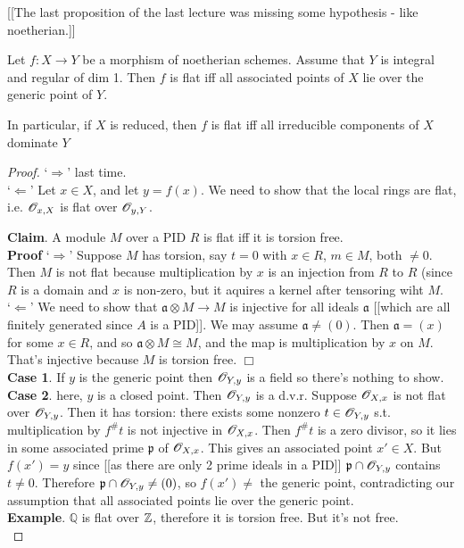  \setcounter{lecture}{25}

[[The last proposition of the last lecture was missing some
hypothesis -  like noetherian.]]

\begin{proposition} Let $f:X\rightarrow Y$ be a morphism of
noetherian schemes. Assume that $Y$ is integral and regular of dim
1. Then $f$ is flat iff all associated points of $X$ lie over the
generic point of $Y$.

In particular, if $X$ is reduced, then $f$ is flat iff all
irreducible components of $X$ dominate $Y$ \end{proposition}
\begin{proof}
`$\Rightarrow$' last time.\\

`$\Leftarrow$' Let $x \in X$, and let $y = f(x)$. We need to show
that the local rings are flat, i.e. $\mathscr{O}_{x,X}$ is flat over
$\mathscr{O}_{y,Y}$.

\textbf{Claim}. A module $M$ over a PID $R$ is flat iff it is
torsion free. \\

\textbf{Proof} `$\Rightarrow$' Suppose $M$ has torsion, say $t =
0$ with $x \in R$, $m \in M$, both $\neq 0$. Then $M$ is not flat
because multiplication by $x$ is an injection from $R$ to $R$
(since $R$ is a domain and $x$ is non-zero, but it aquires a
kernel after
tensoring wiht $M$.\\

`$\Leftarrow$' We need to show that $\mathfrak{a} \otimes M
\rightarrow M$ is injective for all ideals $\mathfrak{a}$ [[which
are all finitely generated since $A$ is a PID]]. We may assume
$\mathfrak{a} \neq (0)$. Then $\mathfrak{a} = (x)$ for some $x \in
R$, and so $\mathfrak{a}\otimes M \cong M$, and the map is
multiplication by $x$ on $M$. That's injective because $M$ is
torsion free. $\Box$\\


\textbf{Case 1}. If $y$ is the generic point then $\mathscr{O}_{Y,y}$ is a
field so there's nothing to show.\\

\textbf{Case 2}. here, $y$ is a closed point. Then $\mathscr{O}_{Y,y}$ is a
d.v.r. Suppose $\mathscr{O}_{X,x}$ is not flat over $\mathscr{O}_{Y,y}$. Then it has
torsion: there exists some nonzero $t \in \mathscr{O}_{Y,y}$ s.t.
multiplication by $f^{\#}t$ is not injective in $\mathscr{O}_{X,x}$. Then
$f^{\#}t$ is a zero divisor, so it lies in some associated prime
$\mathfrak{p}$ of $\mathscr{O}_{X,x}$. This gives an associated point $x'
\in X$. But $f(x') = y$ since [[as there are only 2 prime ideals
in a PID]] $\mathfrak{p} \cap \mathscr{O}_{Y,y}$ contains $t \neq 0$.
Therefore $\mathfrak{p}\cap\mathscr{O}_{Y,y} \neq (0)$, so $f(x') \neq $
the generic point, contradicting our assumption that all
associated points lie
over the generic point.\\

\textbf{Example}. $\mathbb{Q}$ is flat over $\mathbb{Z}$, therefore it is
torsion
free. But it's not free.\\
\end{proof}


